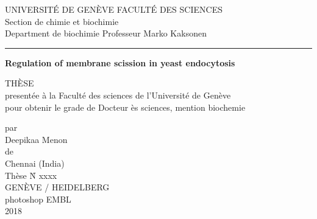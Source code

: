 \documentclass[
12pt, %
ngerman,
english, %
onehalfspacing,
hidelinks,
headsepline, %
]{MastersDoctoralThesis} %
\newcommand\blankpage{%
	\null
	\thispagestyle{empty}%
	\newpage}
\begin{document}
	
	\frontmatter %
	
	\pagestyle{plain} %
	


%
\begin{titlepage}


	{UNIVERSIT\'E DE GEN\`EVE\hspace*{\fill} FACULT\'E DES SCIENCES\\
Section de chimie et biochimie\\
Department de biochimie\hspace*{\fill} Professeur Marko Kaksonen\\}

\vspace{-1mm}
\noindent\rule{14cm}{0.4pt}

\vspace{2.5cm}
\begin{center}
\LARGE\textbf{Regulation of membrane scission in yeast endocytosis} \\
	\vspace{1.5cm}
\end{center}

\begin{center}	
	{TH\`ESE\\
	present\'ee \`a la Facult\'e des sciences de l'Universit\'e de Gen\`eve\\
	pour obtenir le grade de Docteur \`es sciences, mention biochemie\\}

\vspace{2.5cm}
	par\\
	Deepikaa Menon\\
	de\\
	Chennai (India)\\
	\vspace{2cm}
	Th\`ese N\r{} xxxx\\
	\vspace{2cm}
	GEN\`EVE / HEIDELBERG\\
	photoshop EMBL\\	
	2018\\
	

\end{center}
\end{titlepage}
\end{document}
